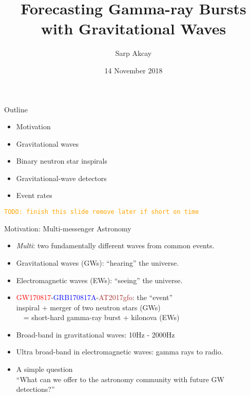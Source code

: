 \documentclass[xcolor=dvipsnames,handout,t]{beamer}
\title[] %
\title[Forecasting GRBs w/ GWs] %
{Forecasting Gamma-ray Bursts with Gravitational Waves}
\subtitle{\todo{Add background image}} %
\author[Sarp Akcay]{Sarp Akcay\inst{1}\inst{2} }
\institute[FSU Jena - UCD] %
{
  \inst{1}%
  FSU Jena %
  \inst{2}%
  University College Dublin
  }
\date[Sabanci University]{14 November 2018}
\newcommand{\todo}[1]{\textcolor{orange}{\texttt{TODO: #1}}}
\newcommand{\red}[1]{\textcolor{red}{#1}}
\newcommand{\bl}[1]{\textcolor{blue}{#1}}
\begin{document}
\begin{frame}
 \titlepage
\end{frame}

\begin{frame}{Outline}
\begin{itemize}
 \item Motivation
 \item Gravitational waves
 \item Binary neutron star inspirals
 \item Gravitational-wave detectors
 \item Event rates 
\end{itemize}
\todo{finish this slide remove later if short on time}

 
\end{frame}


\begin{frame}{Motivation: Multi-messenger Astronomy}
\begin{itemize}
 \item \emph{Multi}: two fundamentally different waves from common events.
 \item[]\quad Gravitational waves (GWs): ``hearing''  the universe.
 \item[]\quad Electromagnetic waves (EWs): ``seeing'' the universe.
 \item \red{GW170817}-\bl{GRB170817A}-\textcolor{brown}{AT2017gfo}: the ``event'' \\
 \quad inspiral + merger of two neutron stars (GWs) \\
 \ \ = short-hard gamma-ray burst + kilonova (EWs)
 \item[] Broad-band in gravitational waves: 10Hz - 2000Hz
 \item[] Ultra broad-band in electromagnetic waves: gamma rays to radio.
 \item A simple question \\
{\small ``What can we offer to the astronomy community with future GW detections?''}
 \end{itemize}


 \end{frame}
\end{document}
